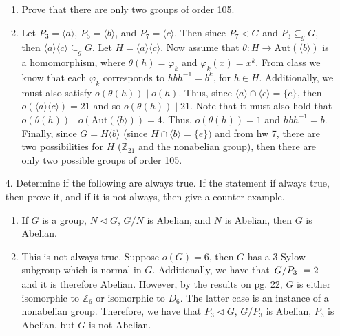 \documentclass[12pt]{article}
\makeatletter
\theoremstyle{definition}
\theoremstyle{remark}
\renewenvironment{proof}[1][\proofname]{\par
  \pushQED{\qed}%
  \normalfont \topsep6\p@\@plus6\p@\relax
  \list{}{\leftmargin=0mm
          \rightmargin=4mm
          \settowidth{\itemindent}{\itshape#1}%
          \labelwidth=\itemindent
          \parsep=0pt \listparindent=\parindent 
  }
  \item[\hskip\labelsep
        \itshape
    #1\@addpunct{.}]\ignorespaces
}{%
  \popQED\endlist\@endpefalse
}
\let\oldproofname=\proofname
\renewcommand{\proofname}{\bf{\textit{\oldproofname}}}
\makeatother
\begin{document}
\begin{enumerate}[leftmargin=*]
\begin{enumerate}[label=(\alph*)]
                \item Prove that there are only two groups of order 105. 
                    \begin{proof}
                        Let $P_3=\langle a\rangle$, $P_5=\langle b\rangle$, and $P_7=\langle c\rangle$. Then since $P_7\triangleleft G$ and $P_3\subseteq_g G$, then $\langle a\rangle\langle c\rangle\subseteq_g G$. Let $H=\langle a\rangle\langle c\rangle$. Now assume that $\theta\colon H\rightarrow\text{Aut}(\langle b\rangle)$ is a homomorphism, where $\theta(h)=\varphi_k$ and $\varphi_k(x)=x^k$. From class we know that each $\varphi_k$ corresponds to $hbh^{-1}=b^k$, for $h\in H$. Additionally, we must also satisfy $o(\theta(h))\mid o(h)$. Thus, since $\langle a\rangle\cap\langle c\rangle=\{e\}$, then $o(\langle a\rangle\langle c\rangle)=21$ and so $o(\theta(h))\mid 21$. Note that it must also hold that $o(\theta(h))\mid o(\text{Aut}(\langle b\rangle))=4$. Thus, $o(\theta(h))=1$ and $hbh^{-1}=b$. Finally, since $G=H\langle b\rangle$ (since $H\cap\langle b\rangle=\{e\})$ and from hw 7, there are two possibilities for $H$ ($\mathbb{Z}_{21}$ and the nonabelian group), then there are only two possible groups of order 105. 
                    \end{proof}
            \end{enumerate}
            
        \newpage
            
            \item[4.] Determine if the following are always true. If the statement if always true, then prove it, and if it is not always, then give a counter example.
                \begin{enumerate}[label=(\alph*)]
                    \item If $G$ is a group, $N\triangleleft G$, $G/N$ is Abelian, and $N$ is Abelian, then $G$ is Abelian.
                        \begin{proof}
                            This is not always true. Suppose $o(G)=6$, then $G$ has a 3-Sylow subgroup which is normal in $G$. Additionally, we have that $\abs{G/P_3}=2$ and it is therefore Abelian. However, by the results on pg. 22, $G$ is either isomorphic to $\mathbb{Z}_6$ or isomorphic to $D_6$. The latter case is an instance of a nonabelian group. Therefore, we have that $P_3\triangleleft G$, $G/P_3$ is Abelian, $P_3$ is Abelian, but $G$ is not Abelian.
                        \end{proof}
                    

\end{enumerate}
\end{enumerate}
\end{document}
